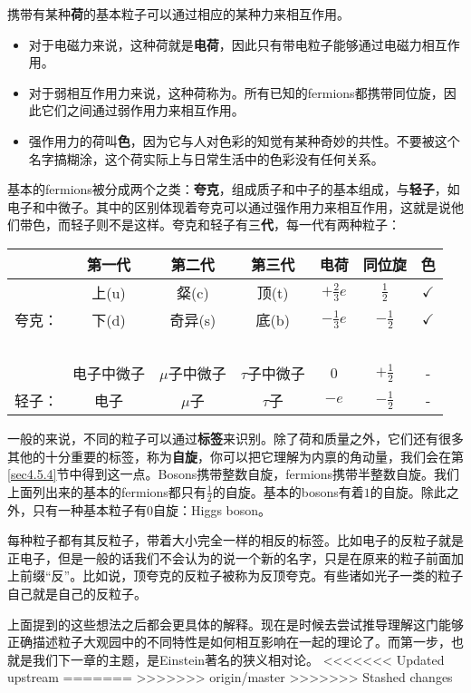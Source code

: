 携带有某种{\bf 荷}的基本粒子可以通过相应的某种力来相互作用。

\begin{itemize}
\item 对于电磁力来说，这种荷就是{\bf 电荷}，因此只有带电粒子能够通过电磁力相互作用。
\item 对于弱相互作用力来说，这种荷称为。所有已知的fermions都携带同位旋，因此它们之间通过弱作用力来相互作用。
\item 强作用力的荷叫{\bf 色}，因为它与人对色彩的知觉有某种奇妙的共性。不要被这个名字搞糊涂，这个荷实际上与日常生活中的色彩没有任何关系。
\end{itemize}

基本的fermions被分成两个之类：{\bf 夸克}，组成质子和中子的基本组成，与{\bf 轻子}，如电子和中微子。其中的区别体现着夸克可以通过强作用力来相互作用，这就是说他们带色，而轻子则不是这样。夸克和轻子有三{\bf 代}，每一代有两种粒子：

\begin{table}[h]
\centering
\begin{tabular}{c|c|c|c|c|c|c}
 \hline
 & 第一代 & 第二代 & 第三代 & 电荷 & 同位旋 & 色 \\
 \hline
 & 上(u)  & 粲(c) &  顶(t) & $+\tfrac{2}{3}e$  & $\tfrac{1}{2}$ & $\checkmark$\\
 夸克： & 下(d) & 奇异(s) &底(b) & $-\tfrac{1}{3}e$ & $-\tfrac{1}{2}$ & $\checkmark$\\
 \hline
 \ &\ &\ &\ &\ &\ &\ \\
 \hline
 & 电子中微子 & $\mu$子中微子 & $\tau$子中微子 & 0 & $+\tfrac{1}{2}$ & -\\
 轻子：&电子 & $\mu$子 & $\tau$子 & $-e$ & $-\tfrac{1}{2}$ & -\\
 \hline
\end{tabular}
\end{table}

一般的来说，不同的粒子可以通过{\bf 标签}来识别。除了荷和质量之外，它们还有很多其他的十分重要的标签，称为{\bf 自旋}，你可以把它理解为内禀的角动量，我们会在第\ref{sec4.5.4}节中得到这一点。Bosons携带整数自旋，fermions携带半整数自旋。我们上面列出来的基本的fermions都只有$\tfrac{1}{2}$的自旋。基本的bosons有着$1$的自旋。除此之外，只有一种基本粒子有$0$自旋：Higgs boson。

每种粒子都有其反粒子，带着大小完全一样的相反的标签。比如电子的反粒子就是正电子，但是一般的话我们不会认为的说一个新的名字，只是在原来的粒子前面加上前缀``反''。比如说，顶夸克的反粒子被称为反顶夸克。有些诸如光子一类的粒子自己就是自己的反粒子。

上面提到的这些想法之后都会更具体的解释。现在是时候去尝试推导理解这门能够正确描述粒子大观园中的不同特性是如何相互影响在一起的理论了。而第一步，也就是我们下一章的主题，是Einstein著名的狭义相对论。
<<<<<<< Updated upstream
=======
>>>>>>> origin/master
>>>>>>> Stashed changes
